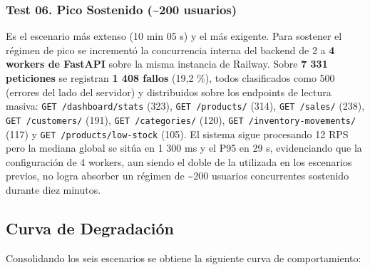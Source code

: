 \subsubsection{Test 06. Pico Sostenido (\textasciitilde200 usuarios)}\label{test-06.-pico-sostenido-200-usuarios}

Es el escenario más extenso (10 min 05 s) y el más exigente. Para sostener el régimen de pico se incrementó la concurrencia interna del backend de 2 a \textbf{4 workers de FastAPI} sobre la misma instancia de Railway. Sobre \textbf{7 331 peticiones} se registran \textbf{1 408 fallos} (19,2 \%), todos clasificados como 500 (errores del lado del servidor) y distribuidos sobre los endpoints de lectura masiva: \texttt{GET\ /dashboard/stats} (323), \texttt{GET\ /products/} (314), \texttt{GET\ /sales/} (238), \texttt{GET\ /customers/} (191), \texttt{GET\ /categories/} (120), \texttt{GET\ /inventory-movements/} (117) y \texttt{GET\ /products/low-stock} (105). El sistema sigue procesando 12 RPS pero la mediana global se sitúa en 1 300 ms y el P95 en 29 s, evidenciando que la configuración de 4 workers, aun siendo el doble de la utilizada en los escenarios previos, no logra absorber un régimen de \textasciitilde200 usuarios concurrentes sostenido durante diez minutos.

\subsection{Curva de Degradación}\label{curva-de-degradaciuxf3n}

Consolidando los seis escenarios se obtiene la siguiente curva de comportamiento:

